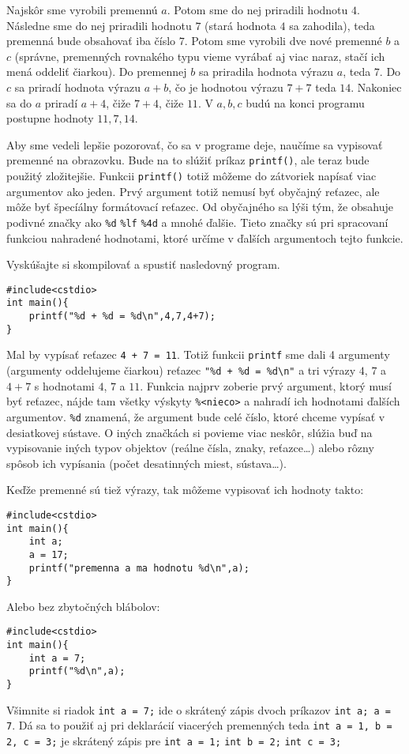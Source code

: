\riesenie
Najskôr sme vyrobili premennú $a$. Potom sme do nej priradili hodnotu $4$.
Následne sme do nej priradili hodnotu $7$ (stará hodnota $4$ sa zahodila), teda
premenná bude obsahovať iba číslo $7$. Potom sme vyrobili dve nové premenné $b$
a $c$ (správne, premenných rovnakého typu vieme vyrábať aj viac naraz, stačí
ich mená oddeliť čiarkou).  Do premennej $b$ sa priradila hodnota výrazu $a$,
teda $7$. Do $c$ sa priradí hodnota výrazu $a + b$, čo je hodnotou výrazu $7 +
7$ teda $14$. Nakoniec sa do $a$ priradí $a + 4$, čiže $7+4$, čiže $11$. V
$a,b,c$ budú na konci programu postupne hodnoty $11,7,14$.

\medskip

Aby sme vedeli lepšie pozorovať, čo sa v programe deje, naučíme sa vypisovať
premenné na obrazovku. Bude na to slúžiť príkaz \verb!printf()!, ale teraz bude
použitý zložitejšie. Funkcii \verb!printf()! totiž môžeme do zátvoriek napísať
viac argumentov ako jeden.  Prvý argument totiž nemusí byť obyčajný reťazec,
ale môže byť špecíálny formátovací reťazec. Od obyčajného sa lýši tým, že
obsahuje podivné značky ako \verb!%d! \verb!%lf! \verb!%4d! a mnohé ďalšie.
Tieto značky sú pri spracovaní funkciou nahradené hodnotami, ktoré určíme v
ďalších argumentoch tejto funkcie.

Vyskúšajte si skompilovať a spustiť nasledovný program.
\begin{lstlisting}
#include<cstdio>
int main(){
    printf("%d + %d = %d\n",4,7,4+7);
}
\end{lstlisting}
Mal by vypísať reťazec \verb!4 + 7 = 11!. Totiž funkcii \verb!printf! sme dali
4 argumenty (argumenty oddelujeme čiarkou) reťazec \verb!"%d + %d = %d\n"! a
tri výrazy $4$, $7$ a $4+7$ s hodnotami $4$, $7$ a $11$.  Funkcia najprv
zoberie prvý argument, ktorý musí byť reťazec, nájde tam všetky výskyty
\verb!%<nieco>! a nahradí ich hodnotami ďalších argumentov.  \verb!%d! znamená,
že argument bude celé číslo, ktoré chceme vypísať v desiatkovej sústave. O
iných značkách si povieme viac neskôr, slúžia buď na vypisovanie iných typov
objektov (reálne čísla, znaky, reťazce\dots) alebo rôzny spôsob ich vypísania
(počet desatinných miest, sústava\dots).

Keďže premenné sú tiež výrazy, tak môžeme vypisovať ich hodnoty takto:
\begin{lstlisting}
#include<cstdio>
int main(){
    int a;
    a = 17;
    printf("premenna a ma hodnotu %d\n",a);
}
\end{lstlisting}
Alebo bez zbytočných blábolov:
\begin{lstlisting}
#include<cstdio>
int main(){
    int a = 7;
    printf("%d\n",a);
}
\end{lstlisting}
Všimnite si riadok \verb!int a = 7;! ide o skrátený zápis dvoch príkazov
\verb!int a; a = 7!. Dá sa to použiť aj pri deklarácií viacerých premenných
teda \verb!int a = 1, b = 2, c = 3;! je skrátený zápis pre \verb!int a = 1;!
\verb!int b = 2;! \verb!int c = 3;!

